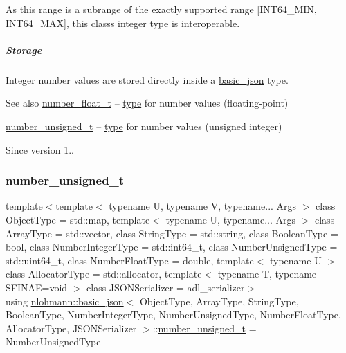 As this range is a subrange of the exactly supported range \mbox{[}I\+N\+T64\+\_\+\+M\+IN, I\+N\+T64\+\_\+\+M\+AX\mbox{]}, this class\textquotesingle{}s integer type is interoperable.

\subparagraph*{Storage}

Integer number values are stored directly inside a \mbox{\hyperlink{classnlohmann_1_1basic__json}{basic\+\_\+json}} type.

\begin{DoxySeeAlso}{See also}
\mbox{\hyperlink{classnlohmann_1_1basic__json_a88d6103cb3620410b35200ee8e313d97}{number\+\_\+float\+\_\+t}} -- \mbox{\hyperlink{classnlohmann_1_1basic__json_a2b2d781d7f2a4ee41bc0016e931cadf7}{type}} for number values (floating-\/point)

\mbox{\hyperlink{classnlohmann_1_1basic__json_ab906e29b5d83ac162e823ada2156b989}{number\+\_\+unsigned\+\_\+t}} -- \mbox{\hyperlink{classnlohmann_1_1basic__json_a2b2d781d7f2a4ee41bc0016e931cadf7}{type}} for number values (unsigned integer)
\end{DoxySeeAlso}
\begin{DoxySince}{Since}
version 1.. 
\end{DoxySince}
\mbox{\label{classnlohmann_1_1basic__json_ab906e29b5d83ac162e823ada2156b989}} 
\subsubsection{\texorpdfstring{number\+\_\+unsigned\+\_\+t}{number\_unsigned\_t}}
{\footnotesize\ttfamily template$<$template$<$ typename U, typename V, typename... Args $>$ class Object\+Type = std\+::map, template$<$ typename U, typename... Args $>$ class Array\+Type = std\+::vector, class String\+Type  = std\+::string, class Boolean\+Type  = bool, class Number\+Integer\+Type  = std\+::int64\+\_\+t, class Number\+Unsigned\+Type  = std\+::uint64\+\_\+t, class Number\+Float\+Type  = double, template$<$ typename U $>$ class Allocator\+Type = std\+::allocator, template$<$ typename T, typename S\+F\+I\+N\+A\+E=void $>$ class J\+S\+O\+N\+Serializer = adl\+\_\+serializer$>$ \\
using \mbox{\hyperlink{classnlohmann_1_1basic__json}{nlohmann\+::basic\+\_\+json}}$<$ Object\+Type, Array\+Type, String\+Type, Boolean\+Type, Number\+Integer\+Type, Number\+Unsigned\+Type, Number\+Float\+Type, Allocator\+Type, J\+S\+O\+N\+Serializer $>$\+::\mbox{\hyperlink{classnlohmann_1_1basic__json_ab906e29b5d83ac162e823ada2156b989}{number\+\_\+unsigned\+\_\+t}} =  Number\+Unsigned\+Type}



